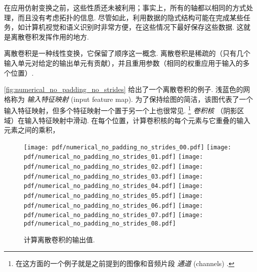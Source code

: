 \documentclass[notitlepage]{ctexrep}
\begin{document}
在应用仿射变换之前，这些性质还未被利用；事实上，所有的轴都以相同的方式处理，而且没有考虑拓扑的信息. 尽管如此，利用数据的隐式结构可能在完成某些任务，如计算机视觉和语义识别时非常方便，在这些情况下最好保存这些数据. 这就是离散卷积发挥作用的地方. 

离散卷积是一种线性变换，它保留了顺序这一概念. 离散卷积是稀疏的（只有几个输入单元对给定的输出单元有贡献），并且重用参数（相同的权重应用于输入的多个位置）. 

\autoref{fig:numerical_no_padding_no_strides} 给出了一个离散卷积的例子. 浅蓝色的网格称为 {\em 输入特征映射} (input feature map). 为了保持绘图的简洁，该图代表了一个输入特征映射，但多个特征映射一个置于另一个上也很常见. \footnote{%
    在这方面的一个例子就是之前提到的图像和音频片段 {\em 通道\/} (channels) .} {\em 卷积核\/} （阴影区域）在输入特征映射中滑动. 在每个位置，计算卷积核的每个元素与它重叠的输入元素之间的乘积，

\begin{figure}[H]
    \centering
\end{figure}

\begin{figure}[p]
    \centering
    \texttt{[image: pdf/numerical\_no\_padding\_no\_strides\_00.pdf]}
    \texttt{[image: pdf/numerical\_no\_padding\_no\_strides\_01.pdf]}
    \texttt{[image: pdf/numerical\_no\_padding\_no\_strides\_02.pdf]}
    \texttt{[image: pdf/numerical\_no\_padding\_no\_strides\_03.pdf]}
    \texttt{[image: pdf/numerical\_no\_padding\_no\_strides\_04.pdf]}
    \texttt{[image: pdf/numerical\_no\_padding\_no\_strides\_05.pdf]}
    \texttt{[image: pdf/numerical\_no\_padding\_no\_strides\_06.pdf]}
    \texttt{[image: pdf/numerical\_no\_padding\_no\_strides\_07.pdf]}
    \texttt{[image: pdf/numerical\_no\_padding\_no\_strides\_08.pdf]}
    \caption{\label{fig:numerical_no_padding_no_strides} 计算离散卷积的输出值.}
\end{figure}
\end{document}
